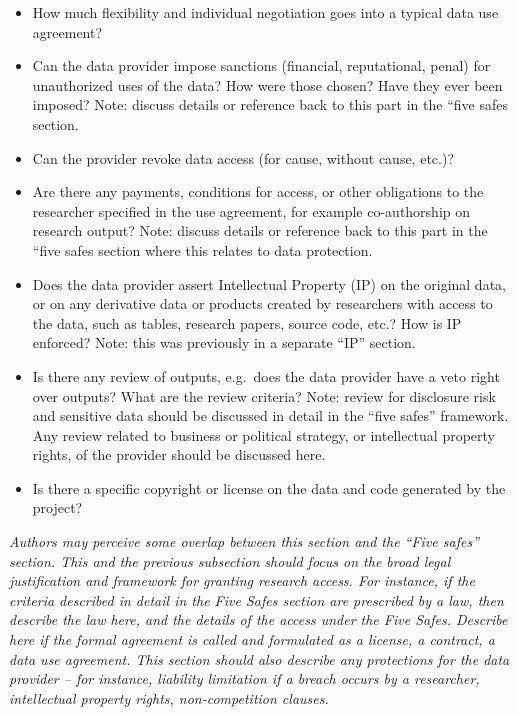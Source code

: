 \documentclass[
]{WileySix}
\providecommand{\tightlist}{%
  \setlength{\itemsep}{0pt}\setlength{\parskip}{0pt}}
\begin{document}
\begin{itemize}
\tightlist
\item
  How much flexibility and individual negotiation goes into a typical data use agreement?
\item
  Can the data provider impose sanctions (financial, reputational, penal) for unauthorized uses of the data? How were those chosen? Have they ever been imposed? Note: discuss details or reference back to this part in the ``five safes section.
\item
  Can the provider revoke data access (for cause, without cause, etc.)?
\item
  Are there any payments, conditions for access, or other obligations to the researcher specified in the use agreement, for example co-authorship on research output? Note: discuss details or reference back to this part in the ``five safes section where this relates to data protection.
\item
  Does the data provider assert Intellectual Property (IP) on the original data, or on any derivative data or products created by researchers with access to the data, such as tables, research papers, source code, etc.? How is IP enforced? Note: this was previously in a separate ``IP'' section.
\item
  Is there any review of outputs, e.g.~does the data provider have a veto right over outputs? What are the review criteria? Note: review for disclosure risk and sensitive data should be discussed in detail in the ``five safes'' framework. Any review related to business or political strategy, or intellectual property rights, of the provider should be discussed here.
\item
  Is there a specific copyright or license on the data and code generated by the project?
\end{itemize}

\emph{Authors may perceive some overlap between this section and the ``Five safes'' section. This and the previous subsection should focus on the broad legal justification and framework for granting research access. For instance, if the criteria described in detail in the Five Safes section are prescribed by a law, then describe the law here, and the details of the access under the Five Safes. Describe here if the formal agreement is called and formulated as a license, a contract, a data use agreement. This section should also describe any protections for the data provider -- for instance, liability limitation if a breach occurs by a researcher, intellectual property rights, non-competition clauses.}
\end{document}
